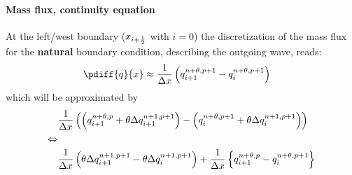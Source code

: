 \paragraph*{Mass flux, continuity equation}
At the left/west boundary ($x_{i+\frac{1}{2}}$ with $i=0$) the discretization of the mass flux for the \textbf{natural} boundary condition, describing the outgoing wave, reads:
\begin{align}
    \pdiff{q}{x} & \approx \frac{1}{\Dx} \left(  q^{n+\theta, p+1}_{i+1} - q^{n+\theta, p+1}_{i} \right)
\end{align}
which will be approximated by
\begin{align}
&\frac{1}{\Delta x} \left( \left( q^{n+\theta, p}_{i+1} + \theta \Delta q^{n+1, p+1}_{i+1}\right)
- \left( q^{n+\theta, p+1}_{i} + \theta \Delta q^{n+1, p+1}_{i}\right) \right)
\\
\Leftrightarrow &
\\
&\frac{1}{\Delta x} \left( \theta \Delta q^{n+1, p+1}_{i+1} - \theta \Delta q^{n+1, p+1}_{i}\right) +
\frac{1}{\Delta x} \left\{ q^{n+\theta, p}_{i+1} - q^{n+\theta, p+1}_{i} \right\}
\end{align}
